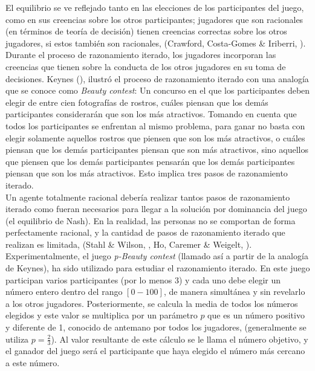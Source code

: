 El equilibrio se ve reflejado tanto en las elecciones de los participantes del juego, como en sus creencias sobre los otros participantes; jugadores que son racionales (en términos de teoría de decisión) tienen creencias correctas sobre los otros jugadores, si estos también son racionales, (Crawford, Costa-Gomes & Iriberri, \citeyear{Crawford}).\\

Durante el proceso de razonamiento iterado, los jugadores incorporan las creencias que tienen sobre la conducta de los otros jugadores en su toma de decisiones. Keynes (\citeyear{Keynes}), ilustró el proceso de razonamiento iterado con una analogía que se conoce como \textit{Beauty contest}: Un concurso en el que los participantes deben elegir de entre cien fotografías de rostros, cuáles piensan que los demás participantes considerarán que son los más atractivos. Tomando en cuenta que todos los participantes se enfrentan al mismo problema, para ganar no basta con elegir solamente aquellos rostros que piensen que son los más atractivos, o cuáles piensan que los demás participantes piensan que son más atractivos, sino aquellos que piensen que los demás participantes pensarán que los demás participantes piensan que son los más atractivos. Esto implica tres pasos de razonamiento iterado.\\

Un agente totalmente racional debería realizar tantos pasos de razonamiento iterado como fueran necesarios para llegar a la solución por dominancia del juego (el equilibrio de Nash). En la realidad, las personas no se comportan de forma perfectamente racional, y la cantidad de pasos de razonamiento iterado que realizan es limitada, (Stahl & Wilson, \citeyear{Stahl}, Ho, Caremer & Weigelt, \citeyear{Ho}).\\

Experimentalmente, el juego \textit{p-Beauty contest} (llamado así a partir de la analogía de Keynes), ha sido utilizado para estudiar el razonamiento iterado. En este juego participan varios participantes (por lo menos 3) y cada uno debe elegir un número entero dentro del rango $[0 - 100]$, de manera simultánea y sin revelarlo a los otros jugadores. Posteriormente, se calcula la media de todos los números elegidos y este valor se multiplica por un parámetro $p$ que es un número positivo y diferente de 1, conocido de antemano por todos los jugadores, (generalmente se utiliza $p = \frac{2}{3}$). Al valor resultante de este cálculo se le llama el número objetivo, y el ganador del juego será el participante que haya elegido el número más cercano a este número.\\

